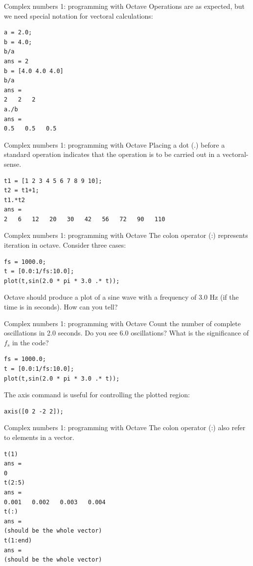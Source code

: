 \documentclass{beamer}
\begin{document}
\begin{frame}[fragile]{Complex numbers 1: programming with Octave}
Operations are as expected, but we need special notation for vectoral calculations:
\begin{verbatim}
a = 2.0;
b = 4.0;
b/a
ans = 2
b = [4.0 4.0 4.0]
b/a
ans =
2   2   2
a./b
ans =
0.5   0.5   0.5
\end{verbatim}
\end{frame}

\begin{frame}[fragile]{Complex numbers 1: programming with Octave}
Placing a dot (.) before a standard operation indicates that the operation is to be carried out in a vectoral-sense.
\begin{verbatim}
t1 = [1 2 3 4 5 6 7 8 9 10];
t2 = t1+1;
t1.*t2
ans =
2   6   12   20   30   42   56   72   90   110
\end{verbatim}
\end{frame}

\begin{frame}[fragile]{Complex numbers 1: programming with Octave}
The colon operator (:) represents iteration in octave.  Consider three cases:  \\
\begin{verbatim}
fs = 1000.0;
t = [0.0:1/fs:10.0];
plot(t,sin(2.0 * pi * 3.0 .* t));
\end{verbatim}
Octave should produce a plot of a sine wave with a frequency of 3.0 Hz (if the time is in seconds).  How can you tell?
\end{frame}

\begin{frame}[fragile]{Complex numbers 1: programming with Octave}
Count the number of complete oscillations in 2.0 seconds.  Do you see 6.0 oscillations?  What is the significance of $f_s$ in the code?
\begin{verbatim}
fs = 1000.0;
t = [0.0:1/fs:10.0];
plot(t,sin(2.0 * pi * 3.0 .* t));
\end{verbatim}
The \alert{axis} command is useful for controlling the plotted region:
\begin{verbatim}
axis([0 2 -2 2]);
\end{verbatim}
\end{frame}

\begin{frame}[fragile]{Complex numbers 1: programming with Octave}
The colon operator (:) also refer to elements in a vector.
\begin{verbatim}
t(1)
ans =
0
t(2:5)
ans = 
0.001   0.002   0.003   0.004
t(:)
ans = 
(should be the whole vector)
t(1:end)
ans =
(should be the whole vector)
\end{verbatim}
\end{frame}
\end{document}
